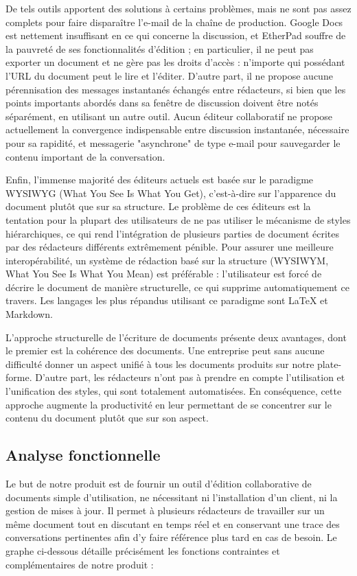 \documentclass[10pt,twocolumn,a4paper,utf8x]{article}
\begin{document}
De tels outils apportent des solutions à certains problèmes, mais ne
sont pas assez complets pour faire disparaître l'e-mail de la chaîne de
production. Google Docs est nettement insuffisant en ce qui concerne la
discussion, et EtherPad souffre de la pauvreté de ses fonctionnalités
d'édition ; en particulier, il ne peut pas exporter un document et ne
gère pas les droits d'accès : n'importe qui possédant l'URL du document
peut le lire et l'éditer. D'autre part, il ne propose aucune
pérennisation des messages instantanés échangés entre rédacteurs, si
bien que les points importants abordés dans sa fenêtre de discussion
doivent être notés séparément, en utilisant un autre outil. Aucun
éditeur collaboratif ne propose actuellement la convergence
indispensable entre discussion instantanée, nécessaire pour sa rapidité,
et messagerie "asynchrone" de type e-mail pour sauvegarder le contenu
important de la conversation.

Enfin, l'immense majorité des éditeurs actuels est basée sur le
paradigme WYSIWYG (What You See Is What You Get), c'est-à-dire sur
l'apparence du document plutôt que sur sa structure. Le problème de ces
éditeurs est la tentation pour la plupart des utilisateurs de ne pas
utiliser le mécanisme de styles hiérarchiques, ce qui rend l'intégration
de plusieurs parties de document écrites par des rédacteurs différents
extrêmement pénible. Pour assurer une meilleure interopérabilité, un
système de rédaction basé sur la structure (WYSIWYM, What You See Is
What You Mean) est préférable : l'utilisateur est forcé de décrire le
document de manière structurelle, ce qui supprime automatiquement ce
travers. Les langages les plus répandus utilisant ce paradigme sont
LaTeX et Markdown.

L'approche structurelle de l'écriture de documents présente deux
avantages, dont le premier est la cohérence des documents. Une
entreprise peut sans aucune difficulté donner un aspect unifié à tous
les documents produits sur notre plate-forme. D'autre part, les
rédacteurs n'ont pas à prendre en compte l'utilisation et l'unification
des styles, qui sont totalement automatisées. En conséquence, cette
approche augmente la productivité en leur permettant de se concentrer
sur le contenu du document plutôt que sur son aspect.

\subsection{Analyse fonctionnelle}

Le but de notre produit est de fournir un outil d'édition collaborative
de documents simple d'utilisation, ne nécessitant ni l'installation d'un
client, ni la gestion de mises à jour. Il permet à plusieurs rédacteurs
de travailler sur un même document tout en discutant en temps réel et en
conservant une trace des conversations pertinentes afin d'y faire
référence plus tard en cas de besoin. Le graphe ci-dessous détaille
précisément les fonctions contraintes et complémentaires de notre
produit :
\end{document}
